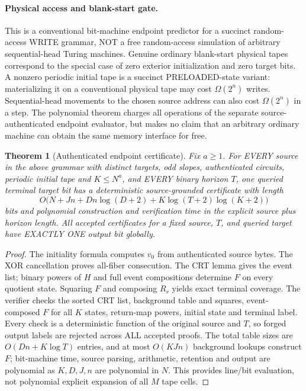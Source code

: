 \documentclass[11pt]{article}
\newtheorem{theorem}{Theorem}
\begin{document}
\paragraph{Physical access and blank-start gate.} This is a conventional bit-machine endpoint predictor for a succinct random-access WRITE grammar, NOT a free random-access simulation of arbitrary sequential-head Turing machines. Genuine ordinary blank-start physical tapes correspond to the special case of zero exterior initialization and zero target bits. A nonzero periodic initial tape is a succinct PRELOADED-state variant: materializing it on a conventional physical tape may cost $\Omega(2^n)$ writes. Sequential-head movements to the chosen source address can also cost $\Omega(2^n)$ in a step. The polynomial theorem charges all operations of the separate source-authenticated endpoint evaluator, but makes no claim that an arbitrary ordinary machine can obtain the same memory interface for free. 
\begin{theorem}[Authenticated endpoint certificate]
Fix $a\ge1$. For EVERY source in the above grammar with distinct targets, odd slopes, authenticated circuits, periodic initial tape and $K\le N^a$, and EVERY binary horizon $T$, one queried terminal target bit has a deterministic source-grounded certificate with length
\[
O\bigl(N+Jn+Dn\log(D+2)+K\log(T+2)\log(K+2)\bigr)
\]
bits and polynomial construction and verification time in the explicit source plus horizon length. All accepted certificates for a fixed source, $T$, and queried target have EXACTLY ONE output bit globally.
\end{theorem}
\begin{proof}
The initiality formula computes $v_0$ from authenticated source bytes. The XOR cancellation proves all-fiber consecution. The CRT lemma gives the event list; binary powers of $H$ and full event compositions determine $F$ on every quotient state. Squaring $F$ and composing $R_r$ yields exact terminal coverage. The verifier checks the sorted CRT list, background table and squares, event-composed $F$ for all $K$ states, return-map powers, initial state and terminal label. Every check is a deterministic function of the original source and $T$, so forged output labels are rejected across ALL accepted proofs. The total table sizes are $O(Dn+K\log T)$ entries, and at most $O(KJn)$ background lookups construct $F$; bit-machine time, source parsing, arithmetic, retention and output are polynomial as $K,D,J,n$ are polynomial in $N$. This provides line/bit evaluation, not polynomial explicit expansion of all $M$ tape cells.
\end{proof}
\end{document}
